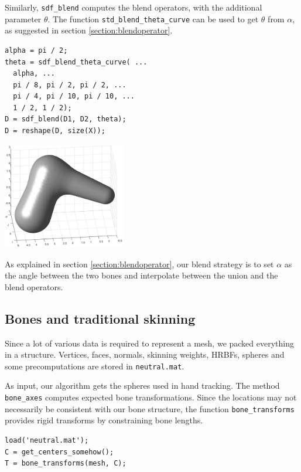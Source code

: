 \documentclass[a4paper,10pt]{article}
\begin{document}
\begin{multicols}{2}
Similarly, \lstinline!sdf_blend! computes the blend operators, with the additional parameter $\theta$.
The function \lstinline!std_blend_theta_curve! can be used to get $\theta$ from $\alpha$, as suggested in section \ref{section:blendoperator}.

\begin{lstlisting}
alpha = pi / 2;
theta = sdf_blend_theta_curve( ...
  alpha, ...
  pi / 8, pi / 2, pi / 2, ...
  pi / 4, pi / 10, pi / 10, ...
  1 / 2, 1 / 2);
D = sdf_blend(D1, D2, theta);
D = reshape(D, size(X));
\end{lstlisting}

\begin{center}
\includegraphics[width=0.4\textwidth]{figs/demo_blend}
\end{center}

As explained in section \ref{section:blendoperator}, our blend strategy is to set $\alpha$ as the angle between the two bones and interpolate between the union and the blend operators.


\subsection{Bones and traditional skinning}

Since a lot of various data is required to represent a mesh, we packed everything in a structure.
Vertices, faces, normals, skinning weights, HRBFs, spheres and some precomputations are stored in \lstinline!neutral.mat!.

As input, our algorithm gets the spheres used in hand tracking.
The method \lstinline!bone_axes! computes expected bone transformations.
Since the locations may not necessarily be consistent with our bone structure, the function \lstinline!bone_transforms! provides rigid transforms by constraining bone lengths.

\begin{lstlisting}
load('neutral.mat');
C = get_centers_somehow();
T = bone_transforms(mesh, C);
\end{lstlisting}


\end{multicols}
\end{document}
